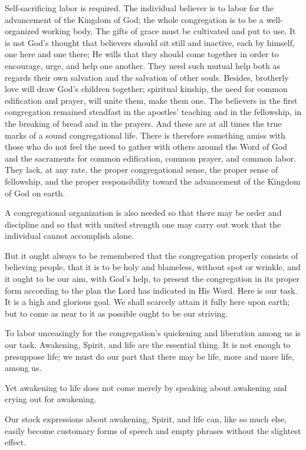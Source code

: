 Self-sacrificing labor is required. The individual believer is to labor for the advancement of the Kingdom of God; the whole congregation is to be a well-organized working body. The gifts of grace must be cultivated and put to use. It is not God’s thought that believers should sit still and inactive, each by himself, one here and one there; He wills that they should come together in order to encourage, urge, and help one another. They need such mutual help both as regards their own salvation and the salvation of other souls. Besides, brotherly love will draw God’s children together; spiritual kinship, the need for common edification and prayer, will unite them, make them one. The believers in the first congregation remained steadfast in the apostles’ teaching and in the fellowship, in the breaking of bread and in the prayers. And these are at all times the true marks of a sound congregational life. There is therefore something amiss with those who do not feel the need to gather with others around the Word of God and the sacraments for common edification, common prayer, and common labor. They lack, at any rate, the proper congregational sense, the proper sense of fellowship, and the proper responsibility toward the advancement of the Kingdom of God on earth.

A congregational organization is also needed so that there may be order and discipline and so that with united strength one may carry out work that the individual cannot accomplish alone.

But it ought always to be remembered that the congregation properly consists of believing people, that it is to be holy and blameless, without spot or wrinkle, and it ought to be our aim, with God’s help, to present the congregation in its proper form according to the plan the Lord has indicated in His Word. Here is our task. It is a high and glorious goal. We shall scarcely attain it fully here upon earth; but to come as near to it as possible ought to be our striving.

To labor unceasingly for the congregation’s quickening and liberation among us is our task. Awakening, Spirit, and life are the essential thing. It is not enough to presuppose life; we must do our part that there may be life, more and more life, among us.

Yet awakening to life does not come merely by speaking about awakening and crying out for awakening.

Our stock expressions about awakening, Spirit, and life can, like so much else, easily become customary forms of speech and empty phrases without the slightest effect.

